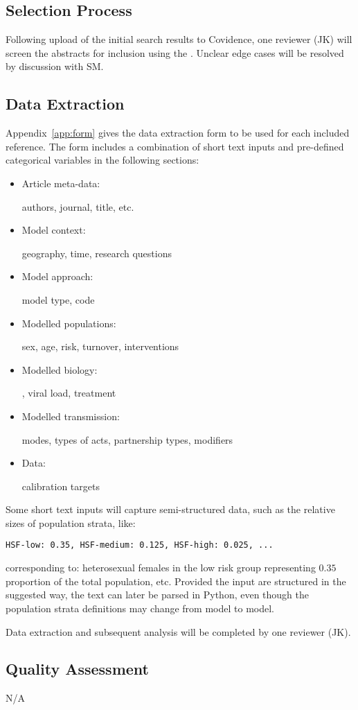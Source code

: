 \documentclass{article}
\begin{document}
\subsection{Selection Process}
Following upload of the initial search results to Covidence,
one reviewer (JK) will screen the abstracts for inclusion
using the .
Unclear edge cases will be resolved by discussion with SM.
\subsection{Data Extraction}
Appendix~\ref{app:form} gives the data extraction form to be used
for each included reference.
The form includes a combination of
short text inputs and pre-defined categorical variables
in the following sections:
\newcommand{\ibox}[1]{\parbox{0.25\linewidth}{#1}}
\begin{itemize}
	\item \ibox{Article meta-data:}     authors, journal, title, etc.
	\item \ibox{Model context:}         geography, time, research questions
	\item \ibox{Model approach:}        model type, code
	\item \ibox{Modelled populations:}  sex, age, risk, turnover, interventions
	\item \ibox{Modelled biology:}      \cdf, viral load, treatment
	\item \ibox{Modelled transmission:} modes, types of acts, partnership types, modifiers
	\item \ibox{Data:}                  calibration targets
\end{itemize}
Some short text inputs will capture semi-structured data,
such as the relative sizes of population strata, like:
\par
  \lstinline|HSF-low: 0.35, HSF-medium: 0.125, HSF-high: 0.025, ...|
\par
corresponding to: heterosexual females in the low risk group representing
$0.35$ proportion of the total population, etc.
Provided the input are structured in the suggested way,
the text can later be parsed in Python,
even though the population strata definitions may change from model to model.
\par
Data extraction and subsequent analysis will be completed by one reviewer (JK).
\subsection{Quality Assessment}
N/A
\end{document}
